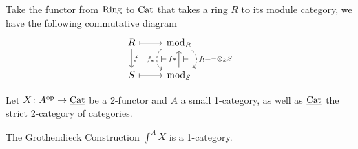 \begin{exmp}
	Take the functor from $ \operatorname{Ring} $ to $ \operatorname{Cat} $ that takes a ring $ R $ to its module category, we have the following commutative diagram
	\[
	\begin{tikzcd}
		R 
		\ar[r, mapsto]
		\ar[d, "f"]
		&
		\Mod_R
		\ar[d, bend left=60, dashed, " f_! = - \otimes_k S "]
		\ar[d, bend right=70, dashed, " f_* "' ]
		\ar[d, bend left, phantom, " \vdash "]
		\ar[d, bend right=55, phantom, " \vdash "']
		\\ 
		S 
		\ar[r, mapsto]
		&
		\Mod_S
		\ar[u, " f* "]
	\end{tikzcd}
	\]
\end{exmp}

Let $ X \colon A^{ \operatorname{op} } \to \underline{ \operatorname{Cat} } $ be a 2-functor and $ A $ a small 1-category, as well as $ \underline{ \operatorname{Cat} } $ the strict 2-category of categories.
 
\begin{prop}
	The Grothendieck Construction $ \int^A X $ is a 1-category.
\end{prop}

